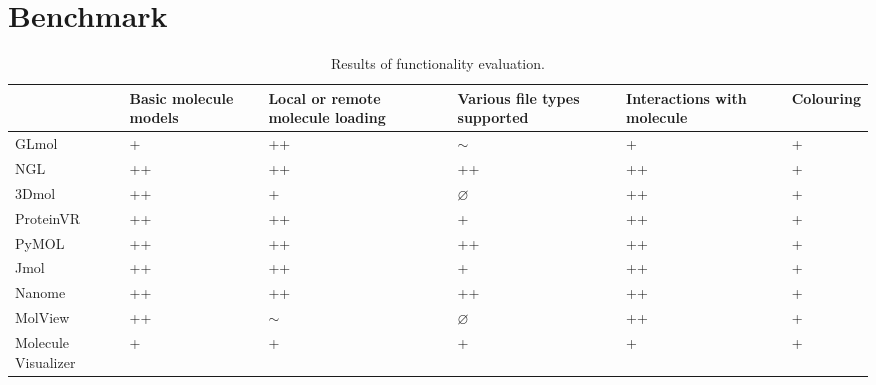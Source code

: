 \section{Benchmark}
\label{sec:evaluation:benchmark}

\begin{table}[t!]
\begin{tabularx}{\textwidth}{| X | X | X | X | X | X |}
\hline
& Basic molecule models & Local or remote molecule loading & Various file types supported & Interactions with molecule & Colouring \\ \hline
GLmol & + & ++ & $\sim$ & + & + \\ \hline
NGL & ++ & ++ & ++ & ++ & + \\ \hline
3Dmol & ++ & + & $\varnothing$ & ++ & + \\ \hline
ProteinVR & ++ & ++ & + & ++ & + \\ \hline
PyMOL & ++ & ++ & ++ & ++ & + \\ \hline
Jmol & ++ & ++ & + & ++ & + \\ \hline
Nanome & ++ & ++ & ++ & ++ & + \\ \hline
MolView & ++ & $\sim$ & $\varnothing$ & ++ & + \\ \hline
Molecule Visualizer & + & + & + & + & + \\ \hline
\end{tabularx}
\caption{Results of functionality evaluation.}
\label{sec.evaluation:benchmark:funceval}
\end{table}

